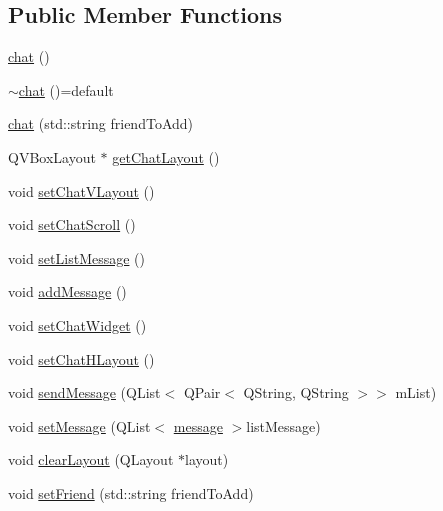 \subsection*{Public Member Functions}
\begin{DoxyCompactItemize}
\item 
\hyperlink{classBabel_1_1Graphic_1_1chat_a047899d763f1fdb6afe4f0f7d8f52363}{chat} ()
\item 
\hyperlink{classBabel_1_1Graphic_1_1chat_a7ee3d1ee7f27d54ff1e7eb9eda73d483}{$\sim$chat} ()=default
\item 
\hyperlink{classBabel_1_1Graphic_1_1chat_a38ad370695a1ab0bedb4e24b93abf79b}{chat} (std\+::string friend\+To\+Add)
\item 
Q\+V\+Box\+Layout $\ast$ \hyperlink{classBabel_1_1Graphic_1_1chat_a9ff3d31756ce9ec6d3116bd1d198ba44}{get\+Chat\+Layout} ()
\item 
void \hyperlink{classBabel_1_1Graphic_1_1chat_af02044d6af68e3cf42d8bde766ce22aa}{set\+Chat\+V\+Layout} ()
\item 
void \hyperlink{classBabel_1_1Graphic_1_1chat_ac30854a6f3b7573064ed6f545e149b69}{set\+Chat\+Scroll} ()
\item 
void \hyperlink{classBabel_1_1Graphic_1_1chat_a3d938faf192392802b0d0cfa8d7b6d96}{set\+List\+Message} ()
\item 
void \hyperlink{classBabel_1_1Graphic_1_1chat_a6c282e8630509239e887b45ff7cfbbe9}{add\+Message} ()
\item 
void \hyperlink{classBabel_1_1Graphic_1_1chat_ab8f6cee22a1fcc985b63a17e7d5d920d}{set\+Chat\+Widget} ()
\item 
void \hyperlink{classBabel_1_1Graphic_1_1chat_ae0a2eaaf04ef950e2b72b629d037542d}{set\+Chat\+H\+Layout} ()
\item 
void \hyperlink{classBabel_1_1Graphic_1_1chat_a24150aefa221f4247451b725beb507f1}{send\+Message} (Q\+List$<$ Q\+Pair$<$ Q\+String, Q\+String $>$$>$ m\+List)
\item 
void \hyperlink{classBabel_1_1Graphic_1_1chat_ab49a30ce08e52838463f420aa1637b37}{set\+Message} (Q\+List$<$ \hyperlink{classBabel_1_1Graphic_1_1message}{message} $>$list\+Message)
\item 
void \hyperlink{classBabel_1_1Graphic_1_1chat_a91b1e1646c93f88b20baf13f91e16ce2}{clear\+Layout} (Q\+Layout $\ast$layout)
\item 
void \hyperlink{classBabel_1_1Graphic_1_1chat_a8aec7fc92e9c2b43de6e1b2ba663d47d}{set\+Friend} (std\+::string friend\+To\+Add)
\end{DoxyCompactItemize}


